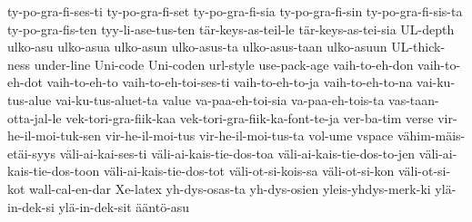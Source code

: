 {  ty-po-gra-fi-ses-ti
  ty-po-gra-fi-set
  ty-po-gra-fi-sia
  ty-po-gra-fi-sin
  ty-po-gra-fi-sis-ta
  ty-po-gra-fis-ten
  tyy-li-ase-tus-ten
  tär-keys-as-teil-le
  tär-keys-as-tei-sia
  UL-depth
  ulko-asu
  ulko-asua
  ulko-asun
  ulko-asus-ta
  ulko-asus-taan
  ulko-asuun
  UL-thick-ness
  under-line
  Uni-code
  Uni-coden
  url-style
  use-pack-age
  vaih-to-eh-don
  vaih-to-eh-dot
  vaih-to-eh-to
  vaih-to-eh-toi-ses-ti
  vaih-to-eh-to-ja
  vaih-to-eh-to-na
  vai-ku-tus-alue
  vai-ku-tus-aluet-ta
  value
  va-paa-eh-toi-sia
  va-paa-eh-tois-ta
  vas-taan-otta-jal-le
  vek-tori-gra-fiik-kaa
  vek-tori-gra-fiik-ka-font-te-ja
  ver-ba-tim
  verse
  vir-he-il-moi-tuk-sen
  vir-he-il-moi-tus
  vir-he-il-moi-tus-ta
  vol-ume
  vspace
  vähim-mäis-etäi-syys
  väli-ai-kai-ses-ti
  väli-ai-kais-tie-dos-toa
  väli-ai-kais-tie-dos-to-jen
  väli-ai-kais-tie-dos-toon
  väli-ai-kais-tie-dos-tot
  väli-ot-si-kois-sa
  väli-ot-si-kon
  väli-ot-si-kot
  wall-cal-en-dar
  Xe-latex
  yh-dys-osas-ta
  yh-dys-osien
  yleis-yhdys-merk-ki
  ylä-in-dek-si
  ylä-in-dek-sit
  ääntö-asu
}
